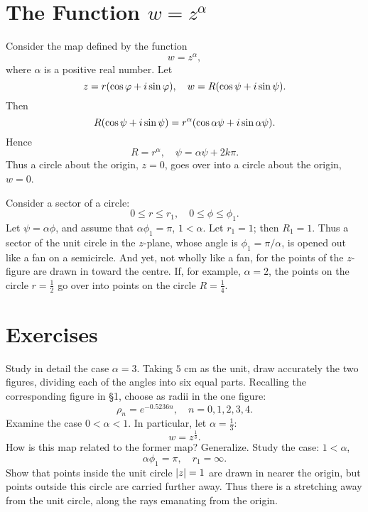 \documentclass[twosided]{memoir}
\begin{document}
\section{The Function $w=z^\alpha $}

Consider the map defined by the function
\begin{equation}\label{3.2.1}
w=z^\alpha,
\end{equation}
where $\alpha $ is a positive real number. Let
\[
	z=r\pbr*{\cos \phi +i\sin \phi } ,\quad w=R\pbr*{\cos \psi +i\sin \psi } 
.\] Then
\[
	R\pbr*{\cos \psi +i\sin \psi } =r^{\alpha }\pbr*{\cos \alpha \psi +i\sin \alpha \psi } 
.\] Hence
\begin{equation}\label{3.2.2}
R=r^\alpha ,\quad \psi =\alpha \psi +2k\pi.
\end{equation}
Thus a circle about the origin, $z=0$, goes over into a circle about the origin, $w=0$.

Consider a sector of a circle:
\begin{equation}\label{3.2.3}
0\le r\le r_1,\quad 0\le \phi \le \phi_1.
\end{equation}
Let $\psi=\alpha \phi $, and assume that $\alpha \phi_1=\pi $, $1<\alpha $. Let $r_1=1$; then $R_1=1$. Thus a sector of the unit circle in the $z$-plane, whose angle is $\phi _1=\pi /\alpha $, is opened out like a fan on a semicircle. And yet, not wholly like a fan, for the points of the $z$-figure are drawn in toward the centre. If, for example, $\alpha =2$, the points on the circle $r=\frac{1}{2}$ go over into points on the circle $R=\frac{1}{4}$.

\section*{Exercises}
\problem Study in detail the case $\alpha =3$. Taking $5$ cm as the unit, draw accurately the two figures, dividing each of the angles into six equal parts. Recalling the corresponding figure in \S 1, choose as radii in the one figure:
\[
\rho _n=e^{-0.5236n}, \quad n=0,1,2,3,4
.\] 
\problem Examine the case $0<\alpha <1$. In particular, let $\alpha =\frac{1}{3}$:
\[
w=z^{\frac{1}{3}}
.\] How is this map related to the former map? Generalize.
\problem Study the case: $1<\alpha $,
\[
\alpha \phi _1=\pi ,\quad r_1=\infty
.\] Show that points inside the unit circle $\abs*{z} =1$ are drawn in nearer the origin, but points outside this circle are carried further away. Thus there is a stretching away from the unit circle, along the rays emanating from the origin.
\end{document}
